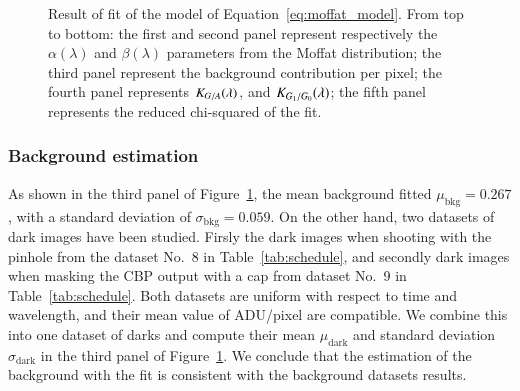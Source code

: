 \begin{figure}[h]
     \centering
     \caption{Result of fit of the model of Equation~\ref{eq:moffat_model}. From top to bottom: the first and second panel represent respectively the $\alpha(\lambda)$ and $\beta(\lambda)$ parameters from the Moffat distribution; the third panel represent the background contribution per pixel; the fourth panel represents $K_{G/A}(\lambda)$, and $K_{G_1/G_0}(\lambda)$; the fifth panel represents the reduced chi-squared of the fit.}
     \label{fig:result_params}
\end{figure}

\subsubsection{Background estimation}
\label{sec:bkg}

As shown in the third panel of Figure~\ref{fig:result_params}, the mean background fitted $\mu_\mathrm{bkg}=0.267$, with a standard deviation of $\sigma_\mathrm{bkg}=0.059$. On the other hand, two datasets of dark images have been studied. Firsly the dark images when shooting with the \bpinhole pinhole from the dataset No.~8 in Table~\ref{tab:schedule}, and secondly dark images when masking the CBP output with a cap from dataset No.~9 in Table~\ref{tab:schedule}. Both datasets are uniform with respect to time and wavelength, and their mean value of ADU/pixel are compatible. We combine this into one dataset of darks and compute their mean $\mu_\mathrm{dark}$ and standard deviation $\sigma_\mathrm{dark}$ in the third panel of Figure~\ref{fig:result_params}. We conclude that the estimation of the background with the fit is consistent with the background datasets results.

